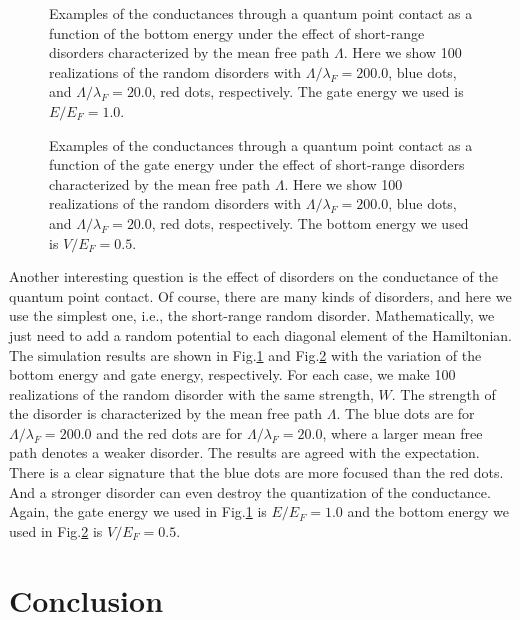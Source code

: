 \documentclass[journal]{IEEEtran}
\begin{document}
\begin{figure}
    \centering
    \caption{Examples of the conductances through a quantum point contact as a function of the bottom energy under the
    effect of short-range disorders characterized by the mean free path $\Lambda$. Here we show 100 realizations of the
random disorders with $\Lambda/\lambda_F=200.0$, blue dots, and $\Lambda/\lambda_F=20.0$, red dots, respectively. The
gate energy we used is $E/E_F=1.0$.}
    \label{fig6}
\end{figure}

\begin{figure}
    \centering
    \caption{Examples of the conductances through a quantum point contact as a function of the gate energy under the
    effect of short-range disorders characterized by the mean free path $\Lambda$. Here we show 100 realizations of the
random disorders with $\Lambda/\lambda_F=200.0$, blue dots, and $\Lambda/\lambda_F=20.0$, red dots, respectively. The
bottom energy we used is $V/E_F=0.5$.}
    \label{fig7}
\end{figure}

Another interesting question is the effect of disorders on the conductance of the quantum point contact. Of course,
there are many kinds of disorders, and here we use the simplest one, i.e., the short-range random disorder.
Mathematically, we just need to add a random potential to each diagonal element of the Hamiltonian. The simulation
results are shown in Fig.\ref{fig6} and Fig.\ref{fig7} with the variation of the bottom energy and gate energy,
respectively. For each case, we make 100 realizations of the random disorder with the same strength, $W$. The strength
of the disorder is characterized by the mean free path $\Lambda$. The blue dots are for $\Lambda/\lambda_F=200.0$ and
the red dots are for $\Lambda/\lambda_F=20.0$, where a larger mean free path denotes a weaker disorder. The results are
agreed with the expectation. There is a clear signature that the blue dots are more focused than the red dots. And a
stronger disorder can even destroy the quantization of the conductance. Again, the gate energy we used in Fig.\ref{fig6}
is $E/E_F=1.0$ and the bottom energy we used in Fig.\ref{fig7} is $V/E_F=0.5$.

\section{Conclusion}\label{Conclusion}
\end{document}
